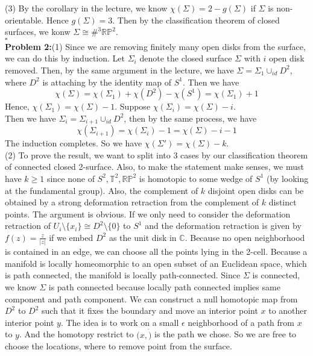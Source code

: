 \documentclass[12pt]{amsart}
\newcommand{\C}{\mathbb{C}}
\begin{document}
(3) By the corollary in the lecture, we know $\chi(\Sigma)=2-g(\Sigma)$ if $\Sigma$ is non-orientable. Hence $g(\Sigma)=3$. Then by the classification theorem of closed surfaces, we konw $\Sigma\cong \#^3\mathbb{RP}^2$.
\\\phantom{qed}\hfill$\square$\\
\textbf{Problem 2:}(1) Since we are removing finitely many open disks from the surface, we can do this by induction. Let $\Sigma_i$ denote the closed surface $\Sigma$ with $i$ open disk removed. Then, by the same argument in the lecture, we have $\Sigma=\Sigma_1\cup_{id} D^2$, where $D^2$ is attaching by the identity map of $S^1$. Then we have 
\[\chi(\Sigma)=\chi(\Sigma_1)+\chi(D^2)-\chi(S^1)=\chi(\Sigma_1)+1\]
Hence, $\chi(\Sigma_1)=\chi(\Sigma)-1$. Suppose $\chi(\Sigma_i)=\chi(\Sigma)-i$.\\
Then we have $\Sigma_i=\Sigma_{i+1}\cup_{id} D^2$, then by the same process, we have 
\[\chi(\Sigma_{i+1})=\chi(\Sigma_{i})-1=\chi(\Sigma)-i-1\]
The induction completes. So we have $\chi(\Sigma')=\chi(\Sigma)-k$.\\
(2) To prove the result, we want to split into 3 cases by our classification theorem of connected closed 2-surface. Also, to make the statement make senses, we must have $k\geq 1$ since none of $S^2,\mathbb{T}^2,\mathbb{RP}^2$ is homotopic to some wedge of $S^1$ (by looking at the fundamental group). Also, the complement of $k$ disjoint open disks can be obtained by a strong deformation retraction from the complement of $k$ distinct points. The argument is obvious. If we only need to consider the deformation retraction of $U_i\setminus \{x_i\}\cong D^2\setminus\{0\}$ to $S^1$ and the deformation retraction is given by $f(z)=\frac{z}{|z|}$ if we embed $D^2$ as the unit disk in $\C$. Because no open neighborhood is contained in an edge, we can choose all the points lying in the 2-cell. Because a manifold is locally homeomorphic to an open subset of an Euclidean space, which is path connected, the manifold is locally path-connected. Since $\Sigma$ is connected, we know $\Sigma$ is path connected because locally path connected implies same component and path component. We can construct a null homotopic map from $D^2$ to $D^2$ such that it fixes the boundary and move an interior point $x$ to another interior point $y$. The idea is to work on a small $\epsilon$ neighborhood of a path from $x$ to $y$. And the homotopy restrict to $(x,\dot)$ is the path we chose. So we are free to choose the locations, where to remove point from the surface.\\
\end{document}
